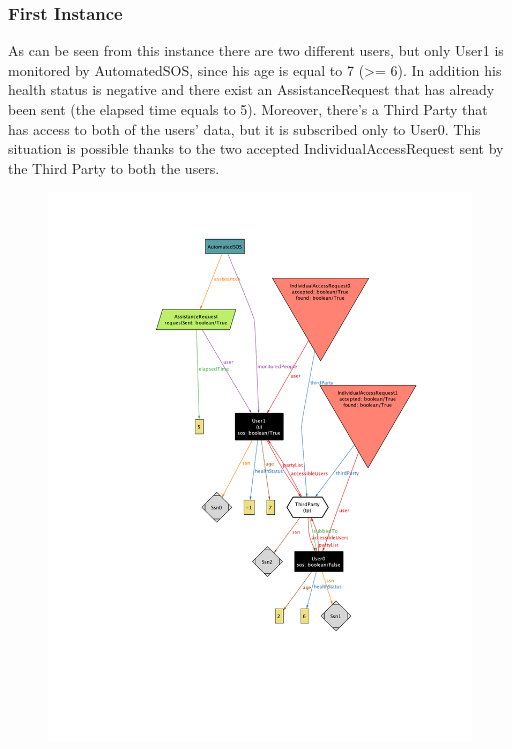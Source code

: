\documentclass[12pt,a4paper]{article}
\begin{document}
		\subsubsection{First Instance}
			As can be seen from this instance there are two different users, but only User1 is monitored by AutomatedSOS, since his age is equal to 7 (>= 6). In addition his health status is negative and there exist an AssistanceRequest that has already been sent (the elapsed time equals to 5). 
			Moreover, there's a Third Party that has access to both of the users' data, but it is subscribed only to User0. This situation is possible thanks to the two accepted IndividualAccessRequest sent by the Third Party to both the users.\\
			\begin{figure}[H]
				\centering
				\includegraphics[height=1.0\linewidth]{Images/first-world}
				\label{fig:first-world}
			\end{figure}
\end{document}
